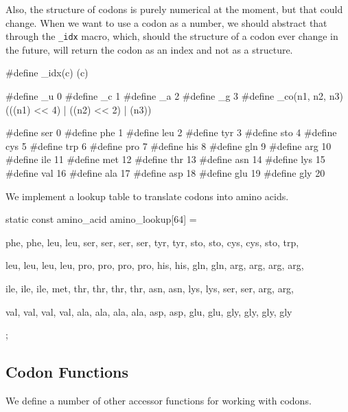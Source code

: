 \documentclass{article}
\begin{document}
      Also, the structure of codons is purely numerical at the moment, but that
      could change. When we want to use a codon as a number, we should abstract
      that through the \verb|_idx| macro, which, should the structure of a codon
      ever change in the future, will return the codon as an index and not as a
      structure.

\begin{ccode}
#define _idx(c) (c)

#define _u 0
#define _c 1
#define _a 2
#define _g 3
#define _co(n1, n2, n3) (((n1) << 4) | ((n2) << 2) | (n3))

#define ser 0
#define phe 1
#define leu 2
#define tyr 3
#define sto 4
#define cys 5
#define trp 6
#define pro 7
#define his 8
#define gln 9
#define arg 10
#define ile 11
#define met 12
#define thr 13
#define asn 14
#define lys 15
#define val 16
#define ala 17
#define asp 18
#define glu 19
#define gly 20
\end{ccode}

      We implement a lookup table to translate codons into amino acids.

\begin{ccode}
static const amino_acid amino_lookup[64] = {
    phe, phe, leu, leu,
    ser, ser, ser, ser,
    tyr, tyr, sto, sto,
    cys, cys, sto, trp,

    leu, leu, leu, leu,
    pro, pro, pro, pro,
    his, his, gln, gln,
    arg, arg, arg, arg,

    ile, ile, ile, met,
    thr, thr, thr, thr,
    asn, asn, lys, lys,
    ser, ser, arg, arg,

    val, val, val, val,
    ala, ala, ala, ala,
    asp, asp, glu, glu,
    gly, gly, gly, gly};
\end{ccode}

    \subsection{Codon Functions}
      \label{sec:codon-functions}

      We define a number of other accessor functions for working with codons.
\end{document}
